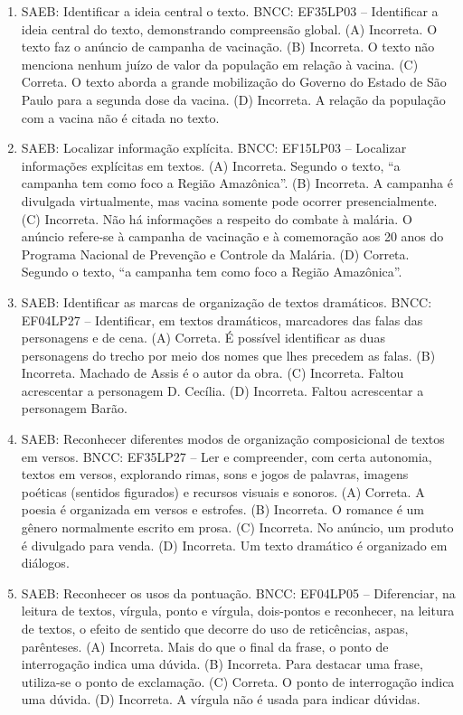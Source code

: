 \begin{enumerate}
\item
SAEB: Identificar a ideia central o texto. BNCC: EF35LP03 -- Identificar a ideia central do texto, demonstrando compreensão global. 
(A) Incorreta. O texto faz o anúncio de campanha de vacinação.
(B) Incorreta. O texto não menciona nenhum juízo de valor da população em relação à vacina. 
(C) Correta. O texto aborda a grande mobilização do Governo do Estado de São Paulo para a segunda dose da vacina. 
(D) Incorreta. A relação da população com a vacina não é citada no texto.

\item
SAEB: Localizar informação explícita. BNCC: EF15LP03 -- Localizar informações explícitas em textos. 
(A) Incorreta. Segundo o texto, ``a campanha tem como foco a Região Amazônica''. 
(B) Incorreta. A campanha é divulgada virtualmente, mas  vacina somente pode ocorrer presencialmente.  
(C) Incorreta. Não há informações a respeito do combate à malária. O anúncio refere-se à campanha de vacinação e à comemoração aos 20 anos do Programa Nacional de Prevenção e Controle da Malária. 
(D) Correta. Segundo o texto, ``a campanha tem como foco a Região Amazônica''.

\item
SAEB: Identificar as marcas de organização de textos dramáticos. BNCC: EF04LP27 -- Identificar, em textos dramáticos, marcadores das falas das personagens e de cena. 
(A) Correta. É possível identificar as duas personagens do trecho por meio dos nomes que lhes precedem as falas. 
(B) Incorreta. Machado de Assis é o autor da obra. 
(C) Incorreta. Faltou acrescentar a personagem D. Cecília. 
(D) Incorreta. Faltou acrescentar a personagem Barão.

\item
SAEB: Reconhecer diferentes modos de organização composicional de textos em versos. BNCC: EF35LP27 -- Ler e compreender, com certa autonomia, textos em versos, explorando rimas, sons e jogos de palavras, imagens poéticas (sentidos figurados) e recursos visuais e sonoros. 
(A) Correta. A poesia é organizada em versos e estrofes. 
(B) Incorreta. O romance é um gênero normalmente escrito em prosa. 
(C) Incorreta. No anúncio, um produto é divulgado para venda. 
(D) Incorreta. Um texto dramático é organizado em diálogos.

\item
SAEB: Reconhecer os usos da pontuação. BNCC: EF04LP05 -- Diferenciar, na leitura de textos, vírgula, ponto e vírgula, dois-pontos e reconhecer, na leitura de textos, o efeito de sentido que decorre do uso de reticências, aspas, parênteses. 
(A) Incorreta. Mais do que o final da frase, o ponto de interrogação indica uma dúvida. 
(B) Incorreta. Para destacar uma frase, utiliza-se o ponto de exclamação. 
(C) Correta. O ponto de interrogação indica uma dúvida. 
(D) Incorreta. A vírgula não é usada para indicar dúvidas.


\end{enumerate}
